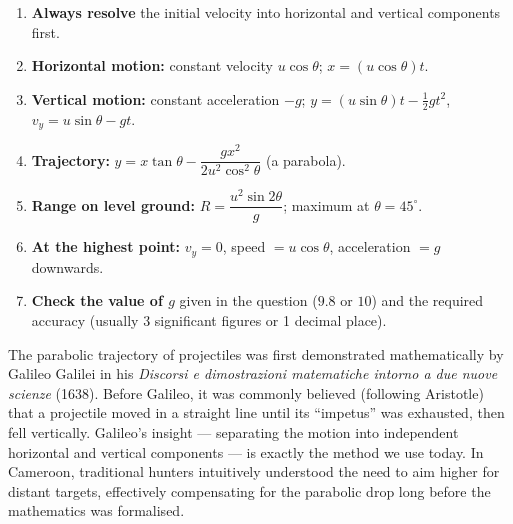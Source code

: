 \documentclass[11pt]{article}
\begin{document}
\begin{aretenir}
\begin{enumerate}
    \item \textbf{Always resolve} the initial velocity into horizontal and vertical components first.
    \item \textbf{Horizontal motion:} constant velocity $u\cos\theta$; $x = (u\cos\theta)t$.
    \item \textbf{Vertical motion:} constant acceleration $-g$; $y = (u\sin\theta)t - \frac{1}{2}gt^2$, $v_y = u\sin\theta - gt$.
    \item \textbf{Trajectory:} $y = x\tan\theta - \dfrac{g x^2}{2u^2\cos^2\theta}$ (a parabola).
    \item \textbf{Range on level ground:} $R = \dfrac{u^2\sin2\theta}{g}$; maximum at $\theta=45^\circ$.
    \item \textbf{At the highest point:} $v_y=0$, speed $= u\cos\theta$, acceleration $= g$ downwards.
    \item \textbf{Check the value of $g$} given in the question ($9.8$ or $10$) and the required accuracy (usually 3 significant figures or 1 decimal place).
\end{enumerate}
\end{aretenir}

\begin{savaistu}
The parabolic trajectory of projectiles was first demonstrated mathematically by Galileo Galilei in his \emph{Discorsi e dimostrazioni matematiche intorno a due nuove scienze} (1638). Before Galileo, it was commonly believed (following Aristotle) that a projectile moved in a straight line until its ``impetus'' was exhausted, then fell vertically. Galileo's insight --- separating the motion into independent horizontal and vertical components --- is exactly the method we use today. In Cameroon, traditional hunters intuitively understood the need to aim higher for distant targets, effectively compensating for the parabolic drop long before the mathematics was formalised.
\end{savaistu}
\end{document}
